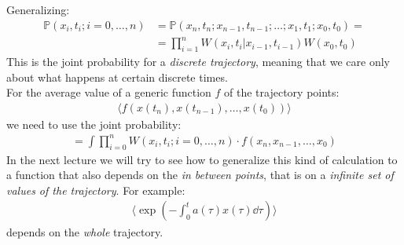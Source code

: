 \documentclass[../template.tex]{subfiles}
\begin{document}
Generalizing: %
\begin{align*}
    \mathbb{P}(x_i, t_i; i=0, \dots, n) &= \mathbb{P}(x_n, t_n; x_{n-1}, t_{n-1}; \dots; x_1, t_1; x_0, t_0) =\\
    &= \prod_{i=1}^n W(x_i, t_i | x_{i-1}, t_{i-1}) W(x_0, t_0)
\end{align*}
This is the joint probability for a \textit{discrete trajectory}, meaning that we care only about what happens at certain discrete times.\\
For the average value of a generic function $f$ of the trajectory points:
\begin{align*}
    \langle f(x(t_n), x(t_{n-1}), \dots, x(t_0)) \rangle
\end{align*}  
we need to use the joint probability:
\begin{align*}
    = \int \prod_{i=0}^n W(x_i, t_i; i=0, \dots, n) \cdot f(x_n, x_{n-1}, \dots, x_0)
\end{align*}
In the next lecture we will try to see how to generalize this kind of calculation to a function that also depends on the \textit{in between points}, that is on a \textit{infinite set of values of the trajectory}. For example:
\begin{align*}
    \langle \exp \left(-\int_0^t a(\tau) x(\tau) \dd{\tau}\right) \rangle
\end{align*}  
depends on the \textit{whole} trajectory.
\end{document}

